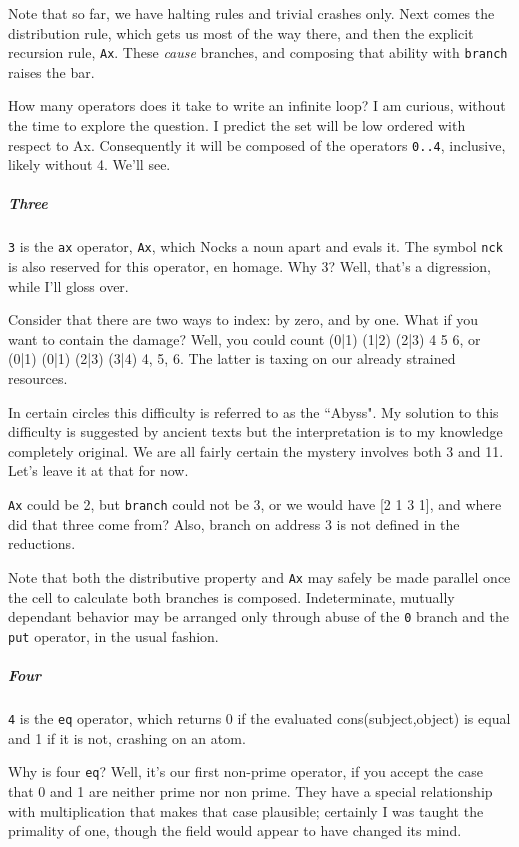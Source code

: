 \documentclass[twoside]{article}
\begin{document}
Note that so far, we have halting rules and trivial crashes only. Next comes the distribution rule, which gets us most of the way there, and then the explicit recursion rule, \texttt{Ax}. These \emph{cause} branches, and composing that ability with \texttt{branch} raises the bar. 

How many operators does it take to write an infinite loop? I am curious, without the time to explore the question. I predict the set will be low ordered with respect to Ax. Consequently it will be composed of the operators \texttt{0..4}, inclusive, likely without 4. We'll see. 

\subparagraph{Three}

\texttt{3} is the \texttt{ax} operator, \texttt{Ax}, which Nocks a noun apart and evals it. The symbol \texttt{nck} is also reserved for this operator, en homage. Why 3? Well, that's a digression, while I'll gloss over.

Consider that there are two ways to index: by zero, and by one. What if you want to contain the damage? Well, you could count (0|1) (1|2) (2|3) 4 5 6, or (0|1) (0|1) (2|3) (3|4) 4, 5, 6. The latter is taxing on our already strained resources. 

In certain circles this difficulty is referred to as the ``Abyss". My solution to this difficulty is suggested by ancient texts but the interpretation is to my knowledge completely original. We are all fairly certain the mystery involves both 3 and 11. Let's leave it at that for now. 

\texttt{Ax} could be 2, but \texttt{branch} could not be 3, or we would have [2 1 3 1], and where did that three come from? Also, branch on address 3 is not defined in the reductions. 

Note that both the distributive property and \texttt{Ax} may safely be made parallel once the cell to calculate both branches is composed. Indeterminate, mutually dependant behavior may be arranged only through abuse of the \texttt{0} branch and the \texttt{put} operator, in the usual fashion. 

\subparagraph{Four}

\texttt{4} is the \texttt{eq} operator, which returns 0 if the evaluated cons(subject,object) is equal and 1 if it is not, crashing on an atom. 

Why is four \texttt{eq}? Well, it's our first non-prime operator, if you accept the case that 0 and 1 are neither prime nor non prime. They have a special relationship with multiplication that makes that case plausible; certainly I was taught the primality of one, though the field would appear to have changed its mind. 
\end{document}
